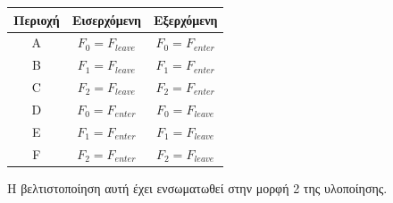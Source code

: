 \begin{center}
  \begin{tabular}{ | c || c || c | }
    \hline
    Περιοχή & Εισερχόμενη & Εξερχόμενη \\ \hline \hline
    A & $F_0 = F_{leave}$ & $F_0 = F_{enter}$ \\ \hline
    B & $F_1 = F_{leave}$ & $F_1 = F_{enter}$ \\ \hline
    C & $F_2 = F_{leave}$ & $F_2 = F_{enter}$ \\ \hline
    D & $F_0 = F_{enter}$ & $F_0 = F_{leave}$ \\ \hline
    E & $F_1 = F_{enter}$ & $F_1 = F_{leave}$ \\ \hline
    F & $F_2 = F_{enter}$ & $F_2 = F_{leave}$ \\ \hline
  \end{tabular}
\end{center}

Η βελτιστοποίηση αυτή έχει ενσωματωθεί στην μορφή 2 της υλοποίησης. 



   
